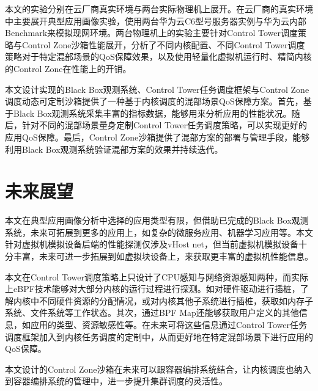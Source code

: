 本文的实验分别在云厂商真实环境与两台实际物理机上展开。在云厂商的真实环境中主要展开典型应用画像实验，使用两台华为云C6型号服务器实例与华为云内部Benchmark来模拟现网环境。两台物理机上的实验主要针对Control Tower调度策略与Control Zone沙箱性能展开，分析了不同内核配置、不同Control Tower调度策略对于特定混部场景的QoS保障效果，以及使用轻量化虚拟机运行时、精简内核的Control Zone在性能上的开销。

本文设计实现的Black Box观测系统、Control Tower任务调度框架与Control Zone调度动态可定制沙箱提供了一种基于内核调度的混部场景QoS保障方案。首先，基于Black Box观测系统采集丰富的指标数据，能够用来分析应用的性能状况。随后，针对不同的混部场景量身定制Control Tower任务调度策略，可以实现更好的应用QoS保障。最后，Control Zone沙箱提供了混部方案的部署与管理手段，能够利用Black Box观测系统验证混部方案的效果并持续迭代。

\section{未来展望}

本文在典型应用画像分析中选择的应用类型有限，但借助已完成的Black Box观测系统，未来可拓展到更多的应用上，如复杂的微服务应用、机器学习应用等。本文针对虚拟机模拟设备后端的性能探测仅涉及vHost net，但当前虚拟机模拟设备十分丰富，未来可进一步拓展到如虚拟块设备上，来获取更丰富的虚拟机性能信息。

本文在Control Tower调度策略上只设计了CPU感知与网络资源感知两种，而实际上eBPF技术能够对大部分内核的运行过程进行探测。如对硬件驱动进行插桩，了解内核中不同硬件资源的分配情况，或对内核其他子系统进行插桩，获取如内存子系统、文件系统等工作状态。其次，通过BPF Map还能够获取用户定义的其他信息，如应用的类型、资源敏感性等。在未来可将这些信息通过Control Tower任务调度框架加入到内核任务调度的定制中，从而更好地在特定混部场景下进行应用的QoS保障。

本文设计的Control Zone沙箱在未来可以跟容器编排系统结合，让内核调度也纳入到容器编排系统的管理中，进一步提升集群调度的灵活性。